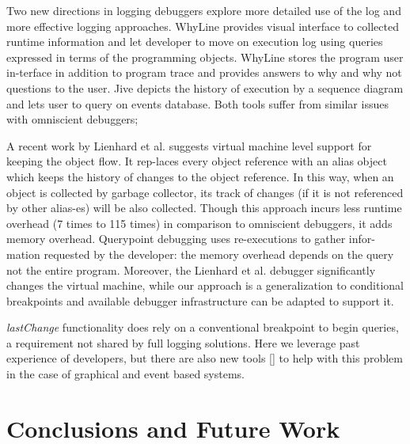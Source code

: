 \documentclass[preprint]{sigplanconf}
\begin{document}
Two new directions in logging debuggers explore more detailed use of the log and more effective logging approaches. WhyLine\cite{Ko} provides visual interface to collected runtime information and let developer to move  on execution log using queries expressed in terms of the programming objects. WhyLine stores the program user in-terface in addition to program trace and provides answers to why and why not questions to the user. Jive\cite{Czyz} depicts the history of execution by a sequence diagram and lets user to query on events database. Both tools suffer from similar issues with omniscient debuggers; 

A recent work by Lienhard et al.\cite{Lienhard} suggests virtual machine level support for keeping the object flow. It rep-laces every object reference with an alias object which keeps the history of changes to the object reference. In this way, when an object is collected by garbage collector, its track of changes (if it is not referenced by other alias-es) will be also collected. Though this approach incurs less runtime overhead (7 times to 115 times) in comparison to omniscient debuggers, it adds memory overhead. Querypoint debugging uses re-executions to gather infor-mation requested by the developer: the memory overhead depends on the query not the entire program. Moreover, the Lienhard et al. debugger significantly changes the virtual machine, while our approach is a generalization to conditional breakpoints and available debugger infrastructure can be adapted to support it. 
 
\textit{lastChange} functionality does rely on a conventional breakpoint to begin queries, a requirement not shared by full logging solutions.  Here we leverage past experience of developers, but there are also new tools [] to help with this problem in the case of graphical and event based systems.


\section{Conclusions and Future Work}






\end{document}
